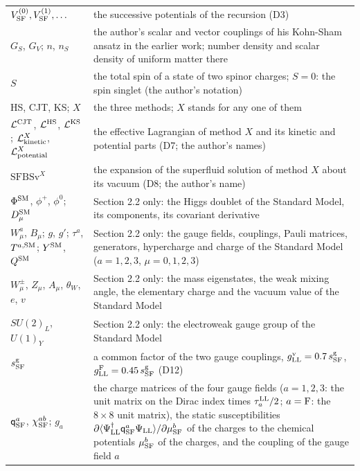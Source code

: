 \documentclass[
  10pt,
]{article}
\begin{document}
\begin{longtable}[]{@{}
  >{\raggedright\arraybackslash}p{}
  >{\raggedright\arraybackslash}p{}@{}}
\(V^{(0)}_{\rm SF},V^{(1)}_{\rm SF},\dots\) & the successive potentials
of the recursion (D3) \\
\(G_S\), \(G_V\); \(n\), \(n_S\) & the author's scalar and vector
couplings of his Kohn-Sham ansatz in the earlier work; number density
and scalar density of uniform matter there \\
\(S\) & the total spin of a state of two spinor charges; \(S=0\): the
spin singlet (the author's notation) \\
HS, CJT, KS; \(X\) & the three methods; \(X\) stands for any one of
them \\
\(\mathcal L^{\rm CJT}\), \(\mathcal L^{\rm HS}\),
\(\mathcal L^{\rm KS}\); \(\mathcal L^X_{\rm kinetic}\),
\(\mathcal L^X_{\rm potential}\) & the effective Lagrangian of method
\(X\) and its kinetic and potential parts (D7; the author's names) \\
\(\mathrm{SFBSv}^X\) & the expansion of the superfluid solution of
method \(X\) about its vacuum (D8; the author's name) \\
\(\Phi^{\rm SM}\), \(\phi^+\), \(\phi^0\); \(D^{\rm SM}_\mu\) & Section
2.2 only: the Higgs doublet of the Standard Model, its components, its
covariant derivative \\
\(W^a_\mu\), \(B_\mu\); \(g\), \(g'\); \(\tau^a\), \(T^{a,{\rm SM}}\);
\(Y^{\rm SM}\), \(Q^{\rm SM}\) & Section 2.2 only: the gauge fields,
couplings, Pauli matrices, generators, hypercharge and charge of the
Standard Model (\(a=1,2,3\), \(\mu=0,1,2,3\)) \\
\(W^\pm_\mu\), \(Z_\mu\), \(A_\mu\), \(\theta_W\), \(e\), \(v\) &
Section 2.2 only: the mass eigenstates, the weak mixing angle, the
elementary charge and the vacuum value of the Standard Model \\
\(SU(2)_L\), \(U(1)_Y\) & Section 2.2 only: the electroweak gauge group
of the Standard Model \\
\(s^{\rm g}_{\rm SF}\) & a common factor of the two gauge couplings,
\(g^{\rm v}_{\rm LL}=0.7\,s^{\rm g}_{\rm SF}\),
\(g^{\rm F}_{\rm LL}=0.45\,s^{\rm g}_{\rm SF}\) (D12) \\
\(\mathsf q^a_{\rm SF}\), \(\chi^{ab}_{\rm SF}\); \(g_a\) & the charge
matrices of the four gauge fields (\(a=1,2,3\): the unit matrix on the
Dirac index times \(\tau^{\rm LL}_a/2\); \(a={\rm F}\): the \(8\times8\)
unit matrix), the static susceptibilities
\(\partial\langle\Psi^\dagger_{\rm LL}\mathsf q^a_{\rm SF}\Psi_{\rm LL}\rangle/\partial\mu^b_{\rm SF}\)
of the charges to the chemical potentials \(\mu^b_{\rm SF}\) of the
charges, and the coupling of the gauge field \(a\)

\end{longtable}
\end{document}
